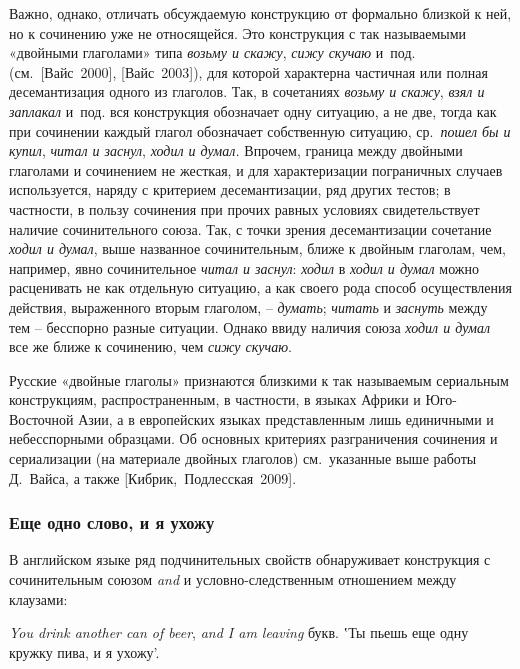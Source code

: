 Важно, однако, отличать обсуждаемую конструкцию от формально близкой к
ней, но к сочинению уже не относящейся. Это конструкция с так
называемыми «двойными глаголами» типа \emph{возьму и скажу}, \emph{сижу
скучаю} и~под. (см.~{[}Вайс~2000{]}, {[}Вайс~2003{]}), для которой
характерна частичная или полная десемантизация одного из глаголов. Так,
в сочетаниях \emph{возьму и скажу}, \emph{взял и заплакал} и~под. вся
конструкция обозначает одну ситуацию, а не две, тогда как при сочинении
каждый глагол обозначает собственную ситуацию, ср.~\emph{пошел бы и
купил}, \emph{читал и заснул}, \emph{ходил и думал.} Впрочем, граница
между двойными глаголами и сочинением не жесткая, и для характеризации
пограничных случаев используется, наряду с критерием десемантизации, ряд
других тестов; в частности, в пользу сочинения при прочих равных
условиях свидетельствует наличие сочинительного союза. Так, с точки
зрения десемантизации сочетание \emph{ходил и думал}, выше названное
сочинительным, ближе к двойным глаголам, чем, например, явно
сочинительное \emph{читал и заснул}: \emph{ходил} в \emph{ходил и думал}
можно расценивать не как отдельную ситуацию, а как своего рода способ
осуществления действия, выраженного вторым глаголом, -- \emph{думать};
\emph{читать} и \emph{заснуть} между тем -- бесспорно разные ситуации.
Однако ввиду наличия союза \emph{ходил и думал} все же ближе к
сочинению, чем \emph{сижу скучаю}.

Русские «двойные глаголы» признаются близкими к так называемым
сериальным конструкциям, распространенным, в частности, в языках Африки
и Юго-Восточной Азии, а в европейских языках представленным лишь
единичными и небесспорными образцами. Об основных критериях
разграничения сочинения и сериализации (на материале двойных глаголов)
см.~указанные выше работы Д.~Вайса, а также
{[}Кибрик,~Подлесская~2009{]}.

\hypertarget{ux435ux449ux435-ux43eux434ux43dux43e-ux441ux43bux43eux432ux43e-ux438-ux44f-ux443ux445ux43eux436ux443}{%
\subsubsection{Еще одно слово, и я
ухожу}\label{ux435ux449ux435-ux43eux434ux43dux43e-ux441ux43bux43eux432ux43e-ux438-ux44f-ux443ux445ux43eux436ux443}}

В английском языке ряд подчинительных свойств обнаруживает конструкция с
сочинительным союзом \emph{and} и условно-следственным отношением между
клаузами:

\emph{You drink another can of beer}, \emph{and I am leaving} букв. ʽТы
пьешь еще одну кружку пива, и я ухожу'.

